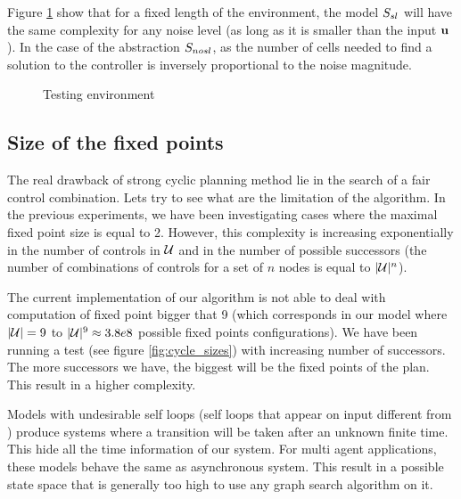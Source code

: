 Figure \ref{fig:simple_int_sl} show that for a fixed length of the environment, the model $S_{sl}$ will have the same complexity for any noise level (as long as it is smaller than the input $ \mathbf{u}$).
In the case of the abstraction $S_{nosl}$, as the number of cells needed to find a solution to the controller is inversely proportional to the noise magnitude.

\begin{figure}
	
	\caption{Testing environment}
	\label{fig:simple_int_sl}
\end{figure}

\subsection{Size of the fixed points}
%
The real drawback of strong cyclic planning method lie in the search of a fair control combination. Lets try to see what are the limitation of the algorithm.
In the previous experiments, we have been investigating cases where the maximal fixed point size is equal to 2. However, this complexity is increasing exponentially in the number of controls in $\mathcal{U}$ and in the number of possible successors (the number of combinations of controls for a set of $n$ nodes is equal to $|\mathcal{U}|^n$).

The current implementation of our algorithm is not able to deal with computation of fixed point bigger that 9 (which corresponds in our model where $|\mathcal{U}|= 9$ to $|\mathcal{U}|^9 \approx 3.8e8$ possible fixed points configurations).
We have been running a test (see figure \ref{fig:cycle_sizes}) with increasing number of successors. 
The more successors we have, the biggest will be the fixed points of the plan. This result in a higher complexity.

Models with undesirable self loops (self loops that appear on input different from \uo) produce systems where a transition will be taken after an unknown finite time.
This hide all the time information of our system.
For multi agent applications, these models behave the same as asynchronous system.
This result in a possible state space that is generally too high to use any graph search algorithm on it.

